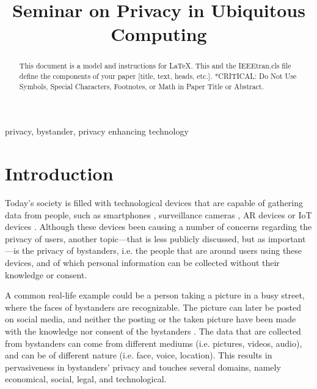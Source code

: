 \documentclass[conference]{IEEEtran}
\begin{document}
\title{Seminar on Privacy in Ubiquitous Computing}

\author{
\and
{}
}

\maketitle

\begin{abstract}
This document is a model and instructions for \LaTeX.
This and the IEEEtran.cls file define the components of your paper [title, text, heads, etc.]. *CRITICAL: Do Not Use Symbols, Special Characters, Footnotes, 
or Math in Paper Title or Abstract.
\end{abstract}

\begin{IEEEkeywords}
privacy, bystander, privacy enhancing technology
\end{IEEEkeywords}

\section{Introduction}
Today's society is filled with technological devices that are capable of gathering data from people, such as smartphones \cite{lu2017privacy}, surveillance cameras \cite{denning2014situ}, \ac{AR} devices \cite{shu2016cardea} or \ac{IoT} devices \cite{lu2017privacy}. Although these devices been causing a number of concerns regarding the privacy of users, another topic---that is less publicly discussed, but as important---is the privacy of bystanders, i.e. the people that are around users using these devices, and of which personal information can be collected without their knowledge or consent. 

A common real-life example could be a person taking a picture in a busy street, where the faces of bystanders are recognizable. The picture can later be posted on social media, and neither the posting or the taken picture have been made with the knowledge nor consent of the bystanders \cite{shu2016cardea}. The data that are collected from bystanders can come from different mediums (i.e. pictures, videos, audio), and can be of different nature (i.e. face, voice, location). This results in pervasiveness in bystanders' privacy and touches several domains, namely economical, social, legal, and technological. 
\end{document}
